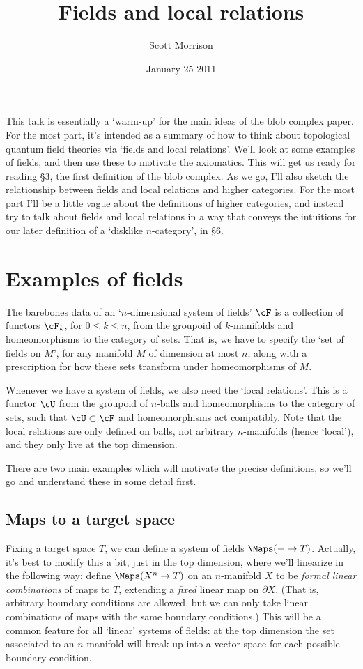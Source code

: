 \documentclass[11pt]{amsart}
\title{Fields and local relations}
\author{Scott Morrison}
\date{January 25 2011}
\theoremstyle{plain}
\newcommand{\bdy}{\partial}
\begin{document}
\maketitle

This talk is essentially a `warm-up' for the main ideas of the blob complex paper. For the most part, it's intended as a summary of how to think about topological quantum field theories via `fields and local relations'. We'll look at some examples of fields, and then use these to motivate the axiomatics. This will get us ready for reading \S 3, the first definition of the blob complex. As we go, I'll also sketch the relationship between fields and local relations and higher categories. For the most part I'll be a little vague about the definitions of higher categories, and instead try to talk about fields and local relations in a way that conveys the intuitions for our later definition of a `disklike $n$-category', in \S 6.

\section{Examples of fields}
The barebones data of an `$n$-dimensional system of fields' $\cF$ is a collection of functors $\cF_k$, for $0 \leq k \leq n$, from the groupoid of $k$-manifolds and homeomorphisms to the category of sets. That is, we have to specify the `set of fields on $M$', for any manifold $M$ of dimension at most $n$, along with a prescription for how these sets transform under homeomorphisms of $M$.

Whenever we have a system of fields, we also need the `local relations'. This is a functor $\cU$ from the groupoid of $n$-balls and homeomorphisms to the category of sets, such that $\cU \subset \cF$ and homeomorphisms act compatibly. Note that the local relations are only defined on balls, not arbitrary $n$-manifolds (hence `local'), and they only live at the top dimension.

There are two main examples which will motivate the precise definitions, so we'll go and understand these in some detail first.

\subsection{Maps to a target space}
Fixing a target space $T$, we can define a system of fields $\Maps(- \to T)$. Actually, it's best to modify this a bit, just in the top dimension, where we'll linearize in the following way: define $\Maps(X^n \to T)$ on an $n$-manifold $X$ to be \emph{formal linear combinations} of maps to $T$, extending a \emph{fixed} linear map on $\bdy X$. (That is, arbitrary boundary conditions are allowed, but we can only take linear combinations of maps with the same boundary conditions.) This will be a common feature for all `linear' systems of fields: at the top dimension the set associated to an $n$-manifold will break up into a vector space for each possible boundary condition.
\end{document}
